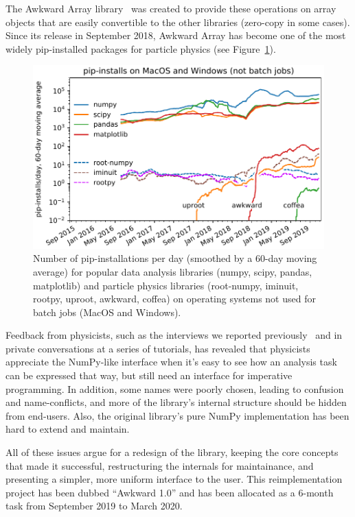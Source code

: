 \documentclass{webofc}
\begin{document}
The Awkward Array library~\cite{root-workshop-2018} was created to provide these operations on array objects that are easily convertible to the other libraries (zero-copy in some cases). Since its release in September 2018, Awkward Array has become one of the most widely pip-installed packages for particle physics (see Figure~\ref{fig:pip-timeline}).

\begin{figure}
\begin{center}
\includegraphics[width=0.75\linewidth]{pip-timeline.pdf}
\end{center}

\vspace{-0.25 cm}
\caption{Number of pip-installations per day (smoothed by a 60-day moving average) for popular data analysis libraries (numpy, scipy, pandas, matplotlib) and particle physics libraries (root-numpy, iminuit, rootpy, uproot, awkward, coffea) on operating systems not used for batch jobs (MacOS and Windows). \label{fig:pip-timeline}}
\end{figure}

Feedback from physicists, such as the interviews we reported previously~\cite{acat-2019} and in private conversations at a series of tutorials, has revealed that physicists appreciate the NumPy-like interface when it's easy to see how an analysis task can be expressed that way, but still need an interface for imperative programming. In addition, some names were poorly chosen, leading to confusion and name-conflicts, and more of the library's internal structure should be hidden from end-users. Also, the original library's pure NumPy implementation has been hard to extend and maintain.

All of these issues argue for a redesign of the library, keeping the core concepts that made it successful, restructuring the internals for maintainance, and presenting a simpler, more uniform interface to the user. This reimplementation project has been dubbed ``Awkward 1.0'' and has been allocated as a 6-month task from September 2019 to March 2020.
\end{document}
